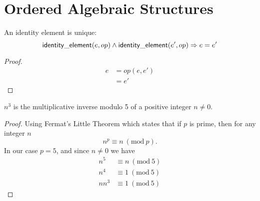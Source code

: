 \chapter{Ordered Algebraic Structures}

\begin{lemma}
	An identity element is unique:
	\[ \mathsf{identity\_element}(e, op) \wedge \mathsf{identity\_element}(e', op) \Rightarrow e = e' \]
\end{lemma}

\begin{proof}
	\begin{align*}
		e &= op(e, e')\\
		  &= e'
	\end{align*}
\end{proof}

\begin{lemma}
	$n^3$ is the multiplicative inverse modulo 5 of a positive integer $n \neq 0$.
\end{lemma}

\begin{proof}
	Using Fermat's Little Theorem which states that if $p$ is prime, then for any integer $n$
	\[ n^p \equiv n\ (\textrm{mod}\ p). \]
	In our case $p = 5$, and since $n \neq 0$ we have
	\begin{align*}
		n^5 &\equiv n\ (\textrm{mod}\ 5)\\
		n^4 &\equiv 1\ (\textrm{mod}\ 5)\\
		nn^3 &\equiv 1\ (\textrm{mod}\ 5)
	\end{align*}
\end{proof}

